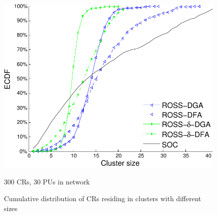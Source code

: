 \documentclass[10pt,journal,compsoc]{IEEEtran}
\theoremstyle{mytheoremstyle}
\theoremstyle{mytheoremstyle}
\theoremstyle{mytheoremstyle}
\begin{document}
\begin{figure}[t]
\begin{multicols}{3}
    \includegraphics[width=\linewidth]{cdf_clusterSize_300.pdf}\par\caption{300 CRs, 30 PUs in network}\label{cdf_clusterSize_300}
\end{multicols}
\caption{Cumulative distribution of CRs residing in clusters with different sizes}
\label{cdf_100_200_300}
\end{figure}
\end{document}

